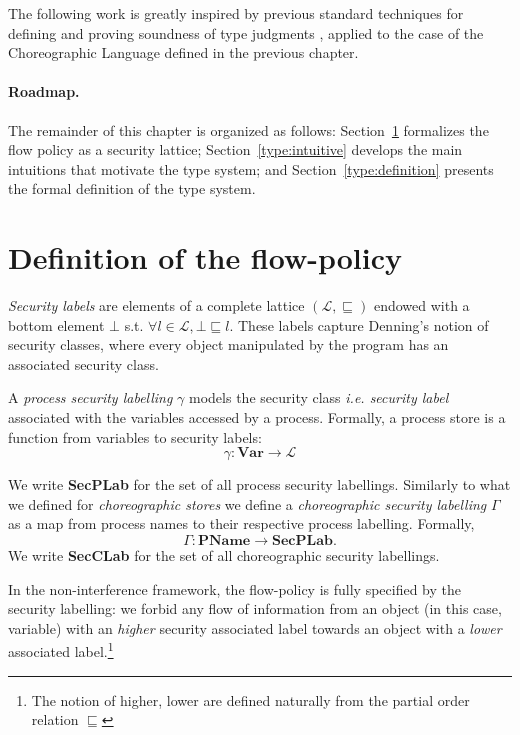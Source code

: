 \documentclass[12pt,a4paper,twoside]{book}
\begin{document}
The following work is greatly inspired by previous standard techniques for defining and proving soundness of type judgments \cite{myers2011proving}\cite{wright1994syntactic}, applied to the case of the Choreographic Language defined in the previous chapter.

\paragraph{Roadmap.}
The remainder of this chapter is organized as follows: Section~\ref{type:flow-policy} formalizes the flow policy as a security lattice; Section~\ref{type:intuitive} develops the main intuitions that motivate the type system; and Section~\ref{type:definition} presents the formal definition of the type system.

\section{Definition of the flow-policy}
\label{type:flow-policy}
\textit{Security labels} are elements of a complete lattice $(\mathscr{L}, \sqsubseteq)$ endowed with a bottom element $\bot$ s.t. $\forall l \in \mathscr{L}, \bot \sqsubseteq l$.
These labels capture Denning's notion of security classes, where every object manipulated by the program has an associated security class.

A \textit{process security labelling} $\gamma$ models the security class \textit{i.e. security label} associated with the variables accessed by a process. Formally, a process store is a function from variables to security labels:
\[
	\gamma : \textbf{Var} \longrightarrow \mathscr{L}
\]

We write \textbf{SecPLab} for the set of all process security labellings.
Similarly to what we defined for \textit{choreographic stores} we define a \textit{choreographic security labelling} $\Gamma$ as a map from process names to their respective process labelling. Formally,
\[
\Gamma : \textbf{PName} \longrightarrow \textbf{SecPLab}.
\]
We write \textbf{SecCLab} for the set of all choreographic security labellings.

In the non-interference framework, the flow-policy is fully specified by the security labelling: we forbid any flow of information from an object (in this case, variable) with an \textit{higher} security associated label towards an object with a \textit{lower} associated label.\footnote{The notion of higher, lower are defined naturally from the partial order relation $\sqsubseteq$}
\end{document}
